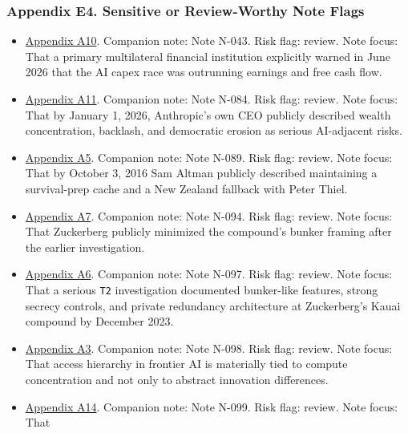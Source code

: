 \documentclass[
  american,
  11pt,
  letterpaper,
]{article}
\providecommand{\tightlist}{%
  \setlength{\itemsep}{0pt}\setlength{\parskip}{0pt}}
\begin{document}
\subsubsection{Appendix E4. Sensitive or Review-Worthy Note
Flags}\label{appendix-e4-sensitive-or-review-worthy-note-flags}

\begin{itemize}
\tightlist
\item
  \hyperref[appendix-a10-annual-economic-report-2026]{Appendix A10}.
  Companion note: Note N-043. Risk flag: review. Note focus: That a
  primary multilateral financial institution explicitly warned in June
  2026 that the AI capex race was outrunning earnings and free cash
  flow.
\item
  \hyperref[appendix-a11-the-adolescence-of-technology]{Appendix A11}.
  Companion note: Note N-084. Risk flag: review. Note focus: That by
  January 1, 2026, Anthropic's own CEO publicly described wealth
  concentration, backlash, and democratic erosion as serious AI-adjacent
  risks.
\item
  \hyperref[appendix-a5-sam-altman-s-manifest-destiny]{Appendix A5}.
  Companion note: Note N-089. Risk flag: review. Note focus: That by
  October 3, 2016 Sam Altman publicly described maintaining a
  survival-prep cache and a New Zealand fallback with Peter Thiel.
\item
  \hyperref[appendix-a7-mark-zuckerberg-downplays-his-5-000-square-foot-underground-bunker-in-hawaii-just-a-little-shelter]{Appendix
  A7}. Companion note: Note N-094. Risk flag: review. Note focus: That
  Zuckerberg publicly minimized the compound's bunker framing after the
  earlier investigation.
\item
  \hyperref[appendix-a6-inside-mark-zuckerbergs-top-secret-hawaii-compound]{Appendix
  A6}. Companion note: Note N-097. Risk flag: review. Note focus: That a
  serious \texttt{T2} investigation documented bunker-like features,
  strong secrecy controls, and private redundancy architecture at
  Zuckerberg's Kauai compound by December 2023.
\item
  \hyperref[appendix-a3-computing-power-and-the-governance-of-artificial-intelligence]{Appendix
  A3}. Companion note: Note N-098. Risk flag: review. Note focus: That
  access hierarchy in frontier AI is materially tied to compute
  concentration and not only to abstract innovation differences.
\item
  \hyperref[appendix-a14-the-digital-sovereignty-imperative]{Appendix
  A14}. Companion note: Note N-099. Risk flag: review. Note focus: That

\end{itemize}
\end{document}
